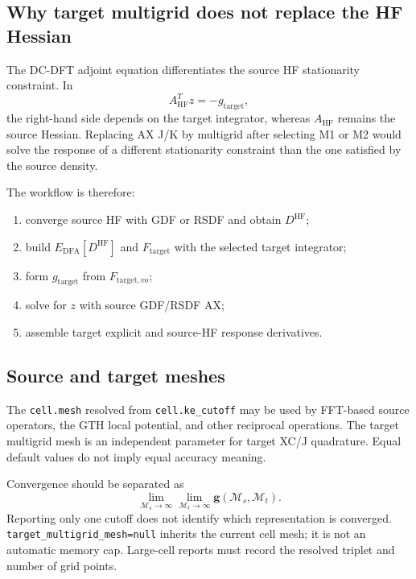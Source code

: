 \subsection{Why target multigrid does not replace the HF Hessian}

The DC-DFT adjoint equation differentiates the source HF stationarity
constraint.  In
\begin{equation}
  A_{\mathrm{HF}}^Tz=-g_{\mathrm{target}},
\end{equation}
the right-hand side depends on the target integrator, whereas
$A_{\mathrm{HF}}$ remains the source Hessian.  Replacing AX J/K by multigrid
after selecting M1 or M2 would solve the response of a different stationarity
constraint than the one satisfied by the source density.

The workflow is therefore:
\begin{enumerate}
  \item converge source HF with GDF or RSDF and obtain $D^{\mathrm{HF}}$;
  \item build $E_{\mathrm{DFA}}[D^{\mathrm{HF}}]$ and $F_{\mathrm{target}}$
        with the selected target integrator;
  \item form $g_{\mathrm{target}}$ from $F_{\mathrm{target},vo}$;
  \item solve for $z$ with source GDF/RSDF AX;
  \item assemble target explicit and source-HF response derivatives.
\end{enumerate}

\subsection{Source and target meshes}

The \texttt{cell.mesh} resolved from \texttt{cell.ke\_cutoff} may be used by
FFT-based source operators, the GTH local potential, and other reciprocal
operations.  The target multigrid mesh is an independent parameter for target
XC/J quadrature.  Equal default values do not imply equal accuracy meaning.

Convergence should be separated as
\begin{equation}
  \lim_{\mathcal M_s\to\infty}
  \lim_{\mathcal M_t\to\infty}
  \mathbf g(\mathcal M_s,\mathcal M_t).
  \label{eq:target-grid-convergence}
\end{equation}
Reporting only one cutoff does not identify which representation is
converged.  \texttt{target\_\allowbreak multigrid\_\allowbreak mesh=null}
inherits the current cell
mesh; it is not an automatic memory cap.  Large-cell reports must record the
resolved triplet and number of grid points.

